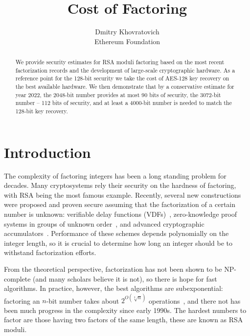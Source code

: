 \documentclass[a4paper]{article}
\title{Cost of Factoring}
\author{Dmitry Khovratovich\\Ethereum Foundation}
\begin{document}
\maketitle

\begin{abstract}
    We provide security estimates for RSA moduli factoring based on the most recent factorization records and the development of large-scale cryptographic hardware. As a reference point for the 128-bit security we take the cost of AES-128 key recovery on the best available hardware. We then demonstrate that by a conservative estimate for year 2022, the 2048-bit number provides at most 90 bits of security, the 3072-bit number -- 112 bits of security, and at least a 4000-bit number is needed to match the 128-bit key recovery. 
\end{abstract}

\section{Introduction}

The complexity of factoring integers has been a long standing problem for decades. Many cryptosystems rely their security on the hardness of factoring, with RSA being the most famous example. Recently, several new constructions were  proposed and proven  secure assuming that the factorization of a certain number is unknown: verifiable delay functions (VDFs)~\cite{DBLP:conf/eurocrypt/Wesolowski19,DBLP:conf/crypto/BonehBBF18}, zero-knowledge proof systems in groups of unknown order~\cite{cryptoeprint:2019:1229}, and advanced cryptographic accumulators~\cite{cryptoeprint:2019:1494}. Performance of these schemes depends polynomially on the integer length, so it is crucial to determine how long an integer should be to withstand factorization efforts.

From the theoretical perspective, factorization has not been shown to be NP-complete (and many scholars believe it is not), so there is hope for fast algorithms. In practice, however, the best algorithms are subexponential: factoring an $n$-bit number takes about $2^{O(\sqrt[3]{n})}$ operations~\cite{lenstra1993development}, and there not has been much progress in the complexity since early 1990s. The hardest numbers to factor are those having two factors of the same length, these are known as RSA moduli.
\end{document}
